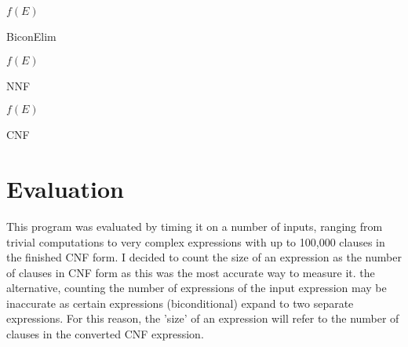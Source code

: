 \documentclass[12pt]{report}
\begin{document}
\begin{algorithm}[H]

\KwRet $f(E)$
\caption{BiconElim}
\end{algorithm}

\begin{algorithm}[H]

\KwRet $f(E)$
\caption{NNF}

\end{algorithm}

\begin{algorithm}[H]


\KwRet $f(E)$
\caption{CNF}
\end{algorithm}


\section*{Evaluation}
\noindent This program was evaluated by timing it on a number of inputs, ranging from trivial computations to very complex expressions with up to 100,000 clauses in the finished CNF form. I decided to count the size of an expression as the number of clauses in CNF form as this was the most accurate way to measure it. the alternative, counting the number of expressions of the input expression may be inaccurate as certain expressions (biconditional) expand to two separate expressions. For this reason, the 'size' of an expression will refer to the number of clauses in the converted CNF expression.\\
\end{document}
